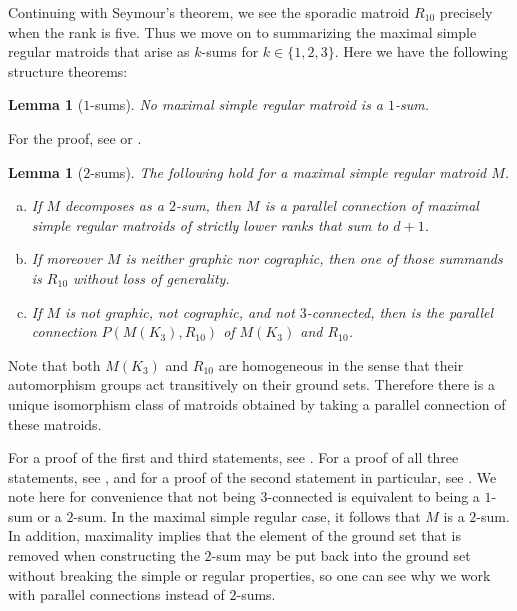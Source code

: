 \documentclass[reqno,12pt]{amsart}
\newtheorem{lemma}[theorem]{Lemma}
\numberwithin{theorem}{section}
\theoremstyle{plain}
\theoremstyle{definition}
\theoremstyle{remark}
\numberwithin{equation}{section}
\numberwithin{table}{section}
\begin{document}
Continuing with Seymour's theorem, we see the sporadic matroid $R_{10}$ precisely when the rank is five. Thus we move on to summarizing the maximal simple regular matroids that arise as $k$-sums for $k \in \{1, 2, 3\}$. Here we have the following structure theorems:

\begin{lemma}[$1$-sums]
No maximal simple regular matroid is a $1$-sum.
\end{lemma}

For the proof, see \cite[Page 412]{DanilovGrishukhin99} or \cite[Theorem 65]{Israel-PhD}.

\begin{lemma}[$2$-sums] The following hold for a maximal simple regular matroid $M$. 
\begin{enumerate}[a)]
    \item If $M$ decomposes as a $2$-sum, then $M$ is a parallel connection of maximal simple regular matroids of strictly lower ranks that sum to $d + 1$.
    \item If moreover $M$ is neither graphic nor cographic, then one of those summands is $R_{10}$ without loss of generality.
    \item If $M$ is not graphic, not cographic, and not $3$-connected, then is the parallel connection $P(M(K_3), R_{10})$ of $M(K_3)$ and $R_{10}$.
\end{enumerate}
\end{lemma}

Note that both $M(K_3)$ and $R_{10}$ are homogeneous in the sense that their automorphism groups act transitively on their ground sets. Therefore there is a unique isomorphism class of matroids obtained by taking a parallel connection of these matroids.

For a proof of the first and third statements, see \cite[Theorems 81 and 82]{Israel-PhD}. For a proof of all three statements, see \cite[Section 7]{DanilovGrishukhin99}, and for a proof of the second statement in particular, see \cite[Lemma 5]{DanilovGrishukhin99}. We note here for convenience that not being $3$-connected is equivalent to being a $1$-sum or a $2$-sum. In the maximal simple regular case, it follows that $M$ is a $2$-sum. In addition, maximality implies that the element of the ground set that is removed when constructing the $2$-sum may be put back into the ground set without breaking the simple or regular properties, so one can see why we work with parallel connections instead of $2$-sums.
\end{document}
